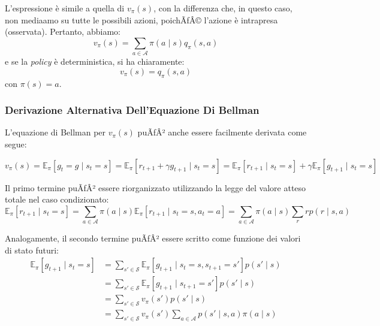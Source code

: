 ﻿\documentclass[11pt, a4paper]{report}
\begin{document}
L'espressione è simile a quella di $v_\pi(s)$, con la differenza che, in questo caso, non mediaamo su tutte le possibili azioni, poichÃƒÂ© l'azione è intrapresa (osservata). Pertanto, abbiamo:
\begin{equation}
v_\pi(s) = \sum_{a \in \mathcal{A}} \pi(a \mid s) q_\pi(s, a)
\end{equation}
e se la \emph{policy} è deterministica, si ha chiaramente:
\begin{equation}
v_\pi(s) = q_\pi(s, a)
\end{equation}
con $\pi(s) = a$.

\subsubsection{Derivazione Alternativa Dell'Equazione Di Bellman}

L'equazione di Bellman per $v_\pi(s)$ puÃƒÂ² anche essere facilmente derivata come segue:

\newpage

\begin{equation}
v_\pi(s) = \mathbb{E}_\pi[g_t = g \mid s_t = s] = \mathbb{E}_\pi[r_{t+1} + \gamma g_{t+1} \mid s_t = s] = \mathbb{E}_\pi[r_{t+1} \mid s_t = s] + \gamma \mathbb{E}_\pi[g_{t+1} \mid s_t = s]
\end{equation}

Il primo termine puÃƒÂ² essere riorganizzato utilizzando la legge del valore atteso totale nel caso condizionato:
\begin{equation}
\mathbb{E}_\pi [r_{t+1} \mid s_t = s] = \sum_{a \in \mathcal{A}} \pi(a \mid s) \mathbb{E}_\pi [r_{t+1} \mid s_t = s, a_t = a] = \sum_{a \in \mathcal{A}} \pi(a \mid s) \sum_r r p(r \mid s, a)
\end{equation}

Analogamente, il secondo termine puÃƒÂ² essere scritto come funzione dei valori di stato futuri:
\begin{equation}
\begin{aligned}
\mathbb{E}_\pi [g_{t+1} \mid s_t = s] &= \sum_{s' \in \mathcal{S}} \mathbb{E}_\pi [g_{t+1} \mid s_t = s, s_{t+1} = s'] p(s' \mid s) \\
&= \sum_{s' \in \mathcal{S}} \mathbb{E}_\pi [g_{t+1} \mid s_{t+1} = s'] p(s' \mid s) \\
&= \sum_{s' \in \mathcal{S}} v_\pi(s') p(s' \mid s) \\
&= \sum_{s' \in \mathcal{S}} v_\pi(s') \sum_{a \in \mathcal{A}} p(s' \mid s, a)\pi(a \mid s)
\end{aligned}
\end{equation}
\end{document}
